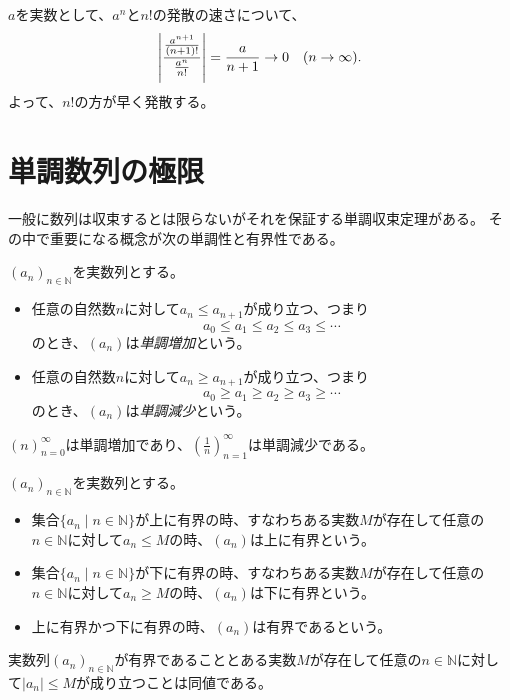 \begin{example}
$a$を実数として、$a^n$と$n!$の発散の速さについて、
$$
\abs{\frac{\frac{a^{n+1}}{(n+1)!}}{\frac{a^n}{n!}}} = \frac{a}{n+1} \to 0 \quad (n \to \infty).
$$
よって、$n!$の方が早く発散する。
\end{example}

\section{単調数列の極限}

一般に数列は収束するとは限らないがそれを保証する単調収束定理がある。
その中で重要になる概念が次の単調性と有界性である。

\begin{definition}[数列の単調性]
$(a_n)_{n \in \mathbb{N}}$を実数列とする。
\begin{itemize}
\item
任意の自然数$n$に対して$a_n \le a_{n+1}$が成り立つ、つまり
$$
a_0 \le a_1 \le a_2 \le a_3 \le \cdots
$$
のとき、$(a_n)$は\emph{単調増加}という。
\item
任意の自然数$n$に対して$a_n \ge a_{n+1}$が成り立つ、つまり
$$
a_0 \ge a_1 \ge a_2 \ge a_3 \ge \cdots
$$
のとき、$(a_n)$は\emph{単調減少}という。
\end{itemize}
\end{definition}

\begin{example}
$(n)_{n = 0}^\infty$は単調増加であり、$(\frac{1}{n})_{n = 1}^\infty$は単調減少である。
\end{example}

\begin{definition}[数列の有界性]
$(a_n)_{n \in \mathbb{N}}$を実数列とする。
\begin{itemize}
\item
集合$\{ a_n \mid n \in \mathbb{N} \}$が上に有界の時、すなわちある実数$M$が存在して任意の$n \in \mathbb{N}$に対して$a_n \le M$の時、$(a_n)$は上に有界という。
\item
集合$\{ a_n \mid n \in \mathbb{N} \}$が下に有界の時、すなわちある実数$M$が存在して任意の$n \in \mathbb{N}$に対して$a_n \ge M$の時、$(a_n)$は下に有界という。
\item
上に有界かつ下に有界の時、$(a_n)$は有界であるという。
\end{itemize}
\end{definition}

\begin{remark}
実数列$(a_n)_{n \in \mathbb{N}}$が有界であることとある実数$M$が存在して任意の$n \in \mathbb{N}$に対して$|a_n| \le M$が成り立つことは同値である。
\end{remark}

